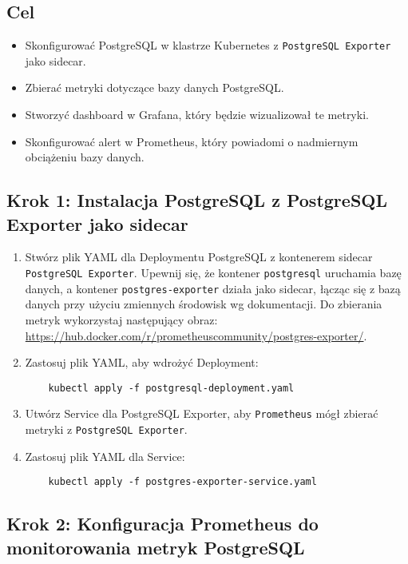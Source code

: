 \documentclass{article}
\begin{document}
\subsection{Cel}
\begin{itemize}
    \item Skonfigurować PostgreSQL w klastrze Kubernetes z \texttt{PostgreSQL Exporter} jako sidecar.
    \item Zbierać metryki dotyczące bazy danych PostgreSQL.
    \item Stworzyć dashboard w Grafana, który będzie wizualizował te metryki.
    \item Skonfigurować alert w Prometheus, który powiadomi o nadmiernym obciążeniu bazy danych.
\end{itemize}

\subsection{Krok 1: Instalacja PostgreSQL z PostgreSQL Exporter jako sidecar}

\begin{enumerate}
    \item Stwórz plik YAML dla Deploymentu PostgreSQL z kontenerem sidecar \texttt{PostgreSQL Exporter}. Upewnij się, że kontener \texttt{postgresql} uruchamia bazę danych, a kontener \texttt{postgres-exporter} działa jako sidecar, łącząc się z bazą danych przy użyciu zmiennych środowisk wg dokumentacji. Do zbierania metryk wykorzystaj następujący obraz:\\
      \url{https://hub.docker.com/r/prometheuscommunity/postgres-exporter/}.
    \item Zastosuj plik YAML, aby wdrożyć Deployment:
    \begin{lstlisting}
    kubectl apply -f postgresql-deployment.yaml
    \end{lstlisting}

    \item Utwórz Service dla PostgreSQL Exporter, aby \texttt{Prometheus} mógł zbierać metryki z \texttt{PostgreSQL Exporter}.
    
    \item Zastosuj plik YAML dla Service:
    \begin{lstlisting}
    kubectl apply -f postgres-exporter-service.yaml
    \end{lstlisting}
\end{enumerate}

\subsection{Krok 2: Konfiguracja Prometheus do monitorowania metryk PostgreSQL}
\end{document}
